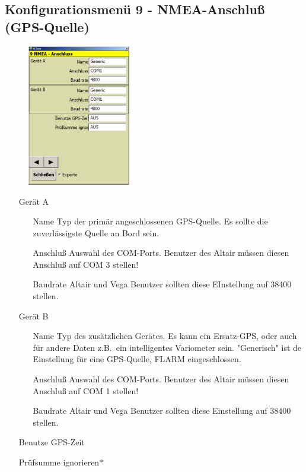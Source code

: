 \subsection{Konfigurationsmenü 9 - NMEA-Anschluß (GPS-Quelle)}\label{Konfig9}
\begin{figure}
\includegraphics[width=4.5cm]{Bilder/Konfig9NMEAAnschluss.png}
\end{figure}
\begin{enumerate}
\item[Gerät A]
\begin{itemize}
\item[Name] Typ der primär angeschlossenen \textsf{GPS}-Quelle. Es sollte die zuverlässigste Quelle an Bord sein.
\item[Anschluß] Auswahl des COM-Ports. Benutzer des \textsf{Altair} müssen diesen Anschluß auf COM 3 stellen!
\item[Baudrate]\textsf{Altair} und \textsf{Vega} Benutzer sollten diese EInstellung auf 38400 stellen.
\end{itemize}
\item[Gerät B]
\begin{itemize}
\item[Name] Typ des zusätzlichen Gerätes. Es kann ein Ersatz-GPS, oder auch für andere Daten z.B.\ ein intelligentes Variometer sein.
    "Generisch" ist de Einstellung für eine \textsf{GPS}-Quelle, FLARM eingeschlossen.
\item[Anschluß]Auswahl des COM-Ports.  Benutzer des \textsf{Altair} müssen diesen Anschluß auf COM 1 stellen!
\item[Baudrate]\textsf{Altair} und \textsf{Vega} Benutzer sollten diese Einstellung auf 38400 stellen.
\end{itemize}
\item[Benutze \textsf{GPS}-Zeit]
\item[Prüfsumme ignorieren$\ast$]
\end{enumerate}



